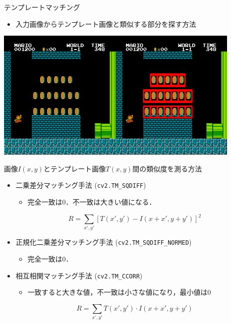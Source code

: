 \documentclass[10pt]{beamer}
\begin{document}
	\begin{frame}{テンプレートマッチング}
	    \begin{itemize}
	        \item 入力画像からテンプレート画像と類似する部分を探す方法
	    \end{itemize}
	    \begin{center}
	        \includegraphics[width=0.9\hsize]{figs/res_mario.jpg}
	    \end{center}
	\end{frame}
	
	\begin{frame}{画像$I(x, y)$とテンプレート画像$T(x, y)$間の類似度を測る方法}
	    \begin{itemize}
	        \item 二乗差分マッチング手法 (\texttt{cv2.TM\_SQDIFF})
	            \begin{itemize}
	                \item 完全一致は0．不一致は大きい値になる．
	            \end{itemize}
	            \[
	                R = \sum_{x',y'} \left[ T(x',y') - I(x+x', y+y') \right]^2
	            \]
	        \item 正規化二乗差分マッチング手法 (\texttt{cv2.TM\_SQDIFF\_NORMED})
	            \begin{itemize}
	                \item 完全一致は0．
	            \end{itemize}
	        \item 相互相関マッチング手法 (\texttt{cv2.TM\_CCORR})
	            \begin{itemize}
	                \item 一致すると大きな値，不一致は小さな値になり，最小値は0
	            \end{itemize}
	            \[
	                R = \sum_{x',y'}T(x',y')\cdot I(x+x', y+y')
	            \]
	    \end{itemize}
	\end{frame}
	
\end{document}
